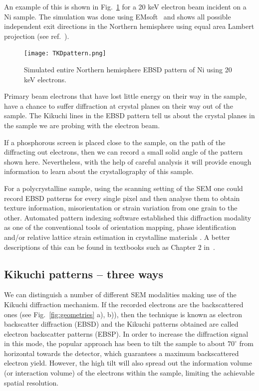 An example of this is shown in Fig.~\ref{fig:tkspatter} for a 20 keV electron beam incident on a Ni sample. The simulation was done using EMsoft~\cite{EMsoft} and shows all possible independent exit directions in the Northern hemisphere using equal area Lambert projection (see ref.~\cite{degraef2013e}). 

\begin{figure}[ht]
\centering
\texttt{[image: TKDpattern.png]}
\caption[EBSD pattern of Ni northern hemisphere.]{Simulated entire Northern hemisphere  EBSD pattern of Ni using 20 keV electrons.}
\label{fig:tkspatter}
\end{figure}


Primary beam electrons that have lost little energy on their way in the sample, have a chance to suffer diffraction at crystal planes on their way out of the sample. The Kikuchi lines in the EBSD pattern tell us about the crystal planes in the sample we are probing with the electron beam. 


 If a phosphorous screen is placed close to the sample, on the path of the diffracting out electrons, then we can record a small solid angle of the pattern shown here. Nevertheless, with the help of careful analysis it will provide enough information to learn about the crystallography of this sample. 
 
 For a polycrystalline sample, using the scanning setting of the SEM one could record  EBSD patterns for every single pixel and then analyse them to obtain texture information, misorientation or strain variation from one grain to the other.  Automated pattern indexing software established this diffraction modality as one of the conventional tools of orientation mapping, phase identification and/or relative lattice strain estimation in crystalline materials \cite{schwartz2009a}. A better descriptions of this can be found in textbooks such as Chapter 2 in~\cite{Maitland07}.



\subsection{Kikuchi patterns -- three ways}
\label{sec:Kikuchi}





We can distinguish a number of different SEM modalities making use of the Kikuchi diffraction mechanism. If the recorded electrons are the backscattered ones (see Fig.~\ref{fig:geometries} a), b)), then the technique is known as electron backscatter diffraction (EBSD) and the Kikuchi patterns obtained are called electron backscatter patterns (EBSP).  In order to increase the diffraction signal in this mode, the popular approach has been to tilt the sample to about $70^{\circ}$ from horizontal towards the detector, which guarantees a maximum backscattered electron yield. However, the high tilt will also spread out the information volume (or interaction volume) of the electrons within the sample, limiting the achievable spatial resolution.


